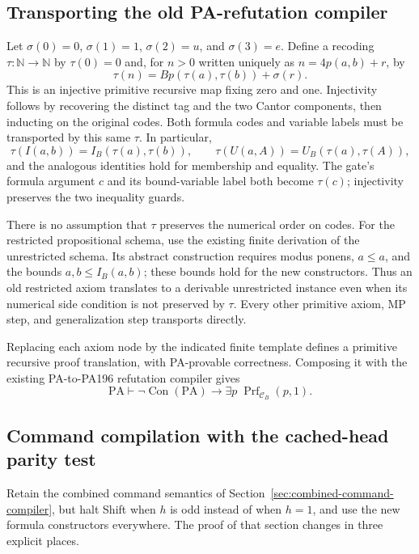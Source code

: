 \subsection{Transporting the old PA-refutation compiler}

Let $\sigma(0)=0$, $\sigma(1)=1$, $\sigma(2)=u$, and $\sigma(3)=e$.
Define a recoding $\tau:\mathbb N\to\mathbb N$ by $\tau(0)=0$ and, for
$n>0$ written uniquely as $n=4p(a,b)+r$, by
\[
 \tau(n)=Bp(\tau(a),\tau(b))+\sigma(r).
\]
This is an injective primitive recursive map fixing zero and one.  Injectivity
follows by recovering the distinct tag and the two Cantor components, then
inducting on the original codes.  Both formula codes and variable labels
must be transported by this same $\tau$.  In particular,
\[
 \tau(I(a,b))=I_B(\tau(a),\tau(b)),\qquad
 \tau(U(a,A))=U_B(\tau(a),\tau(A)),
\]
and the analogous identities hold for membership and equality.  The gate's
formula argument $c$ and its bound-variable label both become $\tau(c)$;
injectivity preserves the two inequality guards.

There is no assumption that $\tau$ preserves the numerical order on codes.
For the restricted propositional schema, use the existing finite derivation
of the unrestricted schema.  Its abstract construction requires modus
ponens, $a\le a$, and the bounds $a,b\le I_B(a,b)$; these bounds hold for
the new constructors.  Thus an old restricted axiom translates to a
derivable unrestricted instance even when its numerical side condition is
not preserved by $\tau$.  Every other primitive axiom, MP step, and
generalization step transports directly.

Replacing each axiom node by the indicated finite template defines a
primitive recursive proof translation, with PA-provable correctness.
Composing it with the existing PA-to-PA196 refutation compiler gives
\[
 \mathrm{PA}\vdash\neg\operatorname{Con}(\mathrm{PA})
 \longrightarrow\exists p\;\operatorname{Prf}_{\mathcal C_B}(p,1).
\]

\subsection{Command compilation with the cached-head parity test}

Retain the combined command semantics of
Section~\ref{sec:combined-command-compiler}, but halt Shift when $h$ is odd
instead of when $h=1$, and use the new formula constructors everywhere.
The proof of that section changes in three explicit places.

